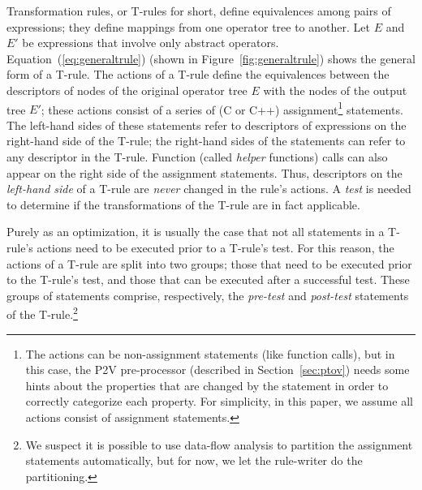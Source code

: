 Transformation rules, or T-rules for short, define equivalences among
pairs of expressions; they define mappings from one operator tree to
another.  Let $E$ and $E'$ be expressions that involve only abstract
operators.  Equation~(\ref{eq:generaltrule}) (shown in
Figure~\ref{fig:generaltrule}) shows the general form of a T-rule.  The
actions of a T-rule define the equivalences between the descriptors of
nodes of the original operator tree $E$ with the nodes of the output
tree $E'$; these actions consist of a series of (C or C++)
assignment\footnote{The actions can be non-assignment statements (like
function calls), but in this case, the P2V pre-processor (described in
Section~\ref{sec:ptov}) needs some hints about the properties that
are changed by the statement in order to correctly categorize each
property.  For simplicity, in this paper, we assume all actions consist
of assignment statements.} statements.  The left-hand sides of these
statements refer to descriptors of expressions on the right-hand side
of the T-rule; the right-hand sides of the statements can refer to any
descriptor in the T-rule.  Function (called \emph{helper} functions)
calls can also appear on the right side of the assignment statements.
Thus, descriptors on the \emph{left-hand side} of a T-rule are
\emph{never} changed in the rule's actions.  A \emph{test} is needed to
determine if the transformations of the T-rule are in fact applicable.

Purely as an optimization, it is usually the case that not all
statements in a T-rule's actions need to be executed prior to a
T-rule's test.  For this reason, the actions of a T-rule are split into
two groups; those that need to be executed prior to the T-rule's test,
and those that can be executed after a successful test.  These groups
of statements comprise, respectively, the \emph{pre-test} and
\emph{post-test} statements of the T-rule.\footnote{We suspect it is
possible to use data-flow analysis to partition the assignment
statements automatically, but for now, we let the rule-writer do the
partitioning.}

